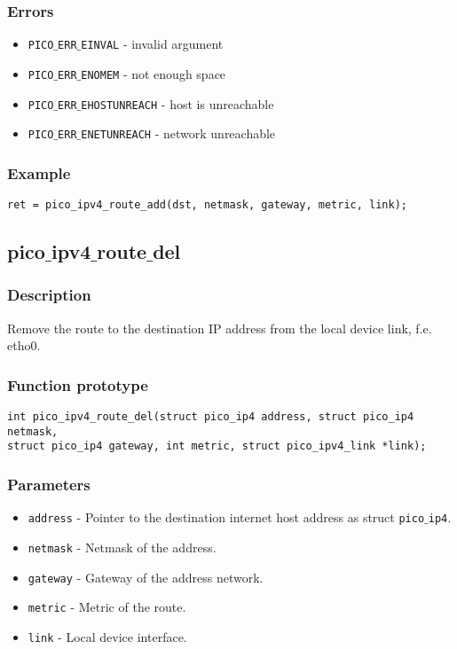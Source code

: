 \subsubsection*{Errors}
\begin{itemize}[noitemsep]
\item \texttt{PICO$\_$ERR$\_$EINVAL} - invalid argument
\item \texttt{PICO$\_$ERR$\_$ENOMEM} - not enough space
\item \texttt{PICO$\_$ERR$\_$EHOSTUNREACH} - host is unreachable
\item \texttt{PICO$\_$ERR$\_$ENETUNREACH} - network unreachable
\end{itemize}

\subsubsection*{Example}
\begin{verbatim}
ret = pico_ipv4_route_add(dst, netmask, gateway, metric, link);
\end{verbatim}



\subsection{pico$\_$ipv4$\_$route$\_$del}

\subsubsection*{Description}
Remove the route to the destination IP address from the local device link, f.e. etho0.

\subsubsection*{Function prototype}
\begin{verbatim}
int pico_ipv4_route_del(struct pico_ip4 address, struct pico_ip4 netmask,
struct pico_ip4 gateway, int metric, struct pico_ipv4_link *link); 
\end{verbatim}

\subsubsection*{Parameters}
\begin{itemize}[noitemsep]
\item \texttt{address} - Pointer to the destination internet host address as struct \texttt{pico$\_$ip4}.
\item \texttt{netmask} - Netmask of the address.
\item \texttt{gateway} - Gateway of the address network.
\item \texttt{metric} - Metric of the route.
\item \texttt{link} - Local device interface.
\end{itemize}

